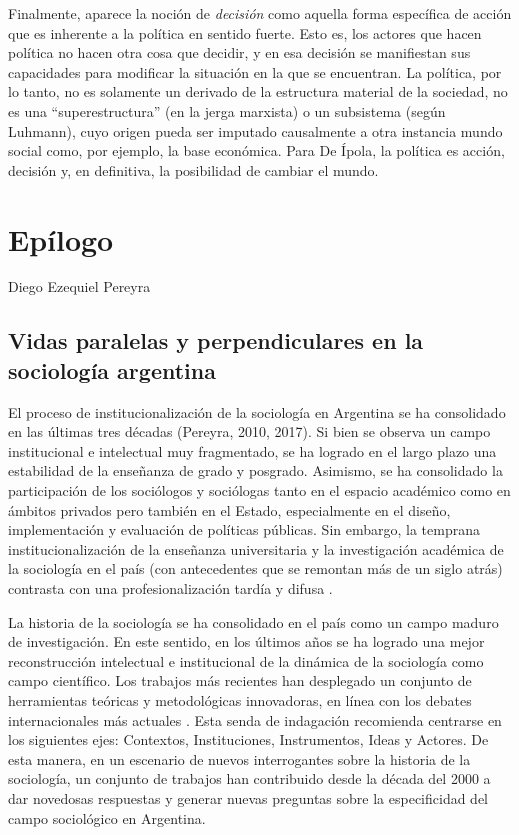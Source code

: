 Finalmente, aparece la noción de \emph{decisión} como aquella forma específica de acción que es inherente a la política en sentido fuerte. Esto es, los actores que hacen política no hacen otra cosa que decidir, y en esa decisión se manifiestan sus capacidades para modificar la situación en la que se encuentran. La política, por lo tanto, no es solamente un derivado de la estructura material de la sociedad, no es una \enquote{superestructura} (en la jerga marxista) o un subsistema (según Luhmann), cuyo origen pueda ser imputado causalmente a otra instancia mundo social como, por ejemplo, la base económica. Para De Ípola, la política es acción, decisión y, en definitiva, la posibilidad de cambiar el mundo.

\backmatter

\chapter[Epílogo]{Epílogo}

Diego Ezequiel Pereyra


\section*{Vidas paralelas y perpendiculares en la sociología argentina}

El proceso de institucionalización de la sociología en Argentina se ha consolidado en las últimas tres décadas (Pereyra, 2010, 2017). Si bien se observa un campo institucional e intelectual muy fragmentado, se ha logrado en el largo plazo una estabilidad de la enseñanza de grado y posgrado. Asimismo, se ha consolidado la participación de los sociólogos y sociólogas tanto en el espacio académico como en ámbitos privados pero también en el Estado, especialmente en el diseño, implementación y evaluación de políticas públicas. Sin embargo, la temprana institucionalización de la enseñanza universitaria y la investigación académica de la sociología en el país (con antecedentes que se remontan más de un siglo atrás) contrasta con una profesionalización tardía y difusa \parencite{1512-SHILS1971}.

La historia de la sociología se ha consolidado en el país como un campo maduro de investigación. En este sentido, en los últimos años se ha logrado una mejor reconstrucción intelectual e institucional de la dinámica de la sociología como campo científico. Los trabajos más recientes han desplegado un conjunto de herramientas teóricas y metodológicas innovadoras, en línea con los debates internacionales más actuales \parencite{1559-CHAPOULIE2009,1562-COLLYER2021,1563-FLECK2015}. Esta senda de indagación recomienda centrarse en los siguientes ejes: Contextos, Instituciones, Instrumentos, Ideas y Actores. De esta manera, en un escenario de nuevos interrogantes sobre la historia de la sociología, un conjunto de trabajos han contribuido desde la década del 2000 a dar novedosas respuestas y generar nuevas preguntas sobre la especificidad del campo sociológico en Argentina.

